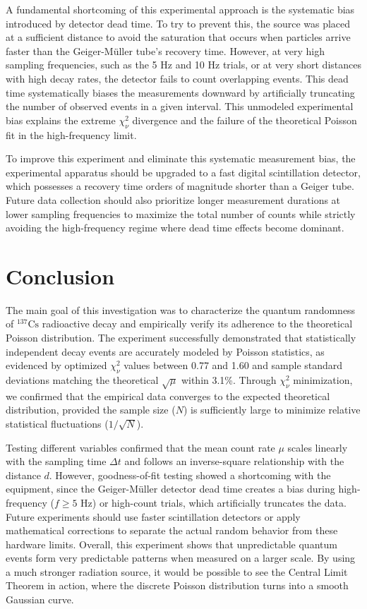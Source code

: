 \documentclass[letterpaper,12pt]{article}
\begin{document}
A fundamental shortcoming of this experimental approach is the systematic bias introduced by detector dead time. To try to prevent this, the source was placed at a sufficient distance to avoid the saturation that occurs when particles arrive faster than the Geiger-Müller tube's recovery time. However, at very high sampling frequencies, such as the 5 Hz and 10 Hz trials, or at very short distances with high decay rates, the detector fails to count overlapping events. This dead time systematically biases the measurements downward by artificially truncating the number of observed events in a given interval. This unmodeled experimental bias explains the extreme $\chi^2_\nu$ divergence and the failure of the theoretical Poisson fit in the high-frequency limit. 

To improve this experiment and eliminate this systematic measurement bias, the experimental apparatus should be upgraded to a fast digital scintillation detector, which possesses a recovery time orders of magnitude shorter than a Geiger tube. Future data collection should also prioritize longer measurement durations at lower sampling frequencies to maximize the total number of counts while strictly avoiding the high-frequency regime where dead time effects become dominant.

\section{Conclusion}

The main goal of this investigation was to characterize the quantum randomness of $^{137}\text{Cs}$ radioactive decay and empirically verify its adherence to the theoretical Poisson distribution. The experiment successfully demonstrated that statistically independent decay events are accurately modeled by Poisson statistics, as evidenced by optimized $\chi_\nu^2$ values between 0.77 and 1.60 and sample standard deviations matching the theoretical $\sqrt{\mu}$ within 3.1\%. Through $\chi^2_\nu$ minimization, we confirmed that the empirical data converges to the expected theoretical distribution, provided the sample size ($N$) is sufficiently large to minimize relative statistical fluctuations ($1/\sqrt{N}$).

Testing different variables confirmed that the mean count rate $\mu$ scales linearly with the sampling time $\Delta t$ and follows an inverse-square relationship with the distance $d$. However, goodness-of-fit testing showed a shortcoming with the equipment, since the Geiger-Müller detector dead time creates a bias during high-frequency ($f \ge 5$ Hz) or high-count trials, which artificially truncates the data. Future experiments should use faster scintillation detectors or apply mathematical corrections to separate the actual random behavior from these hardware limits. Overall, this experiment shows that unpredictable quantum events form very predictable patterns when measured on a larger scale. By using a much stronger radiation source, it would be possible to see the Central Limit Theorem in action, where the discrete Poisson distribution turns into a smooth Gaussian curve.
\end{document}
